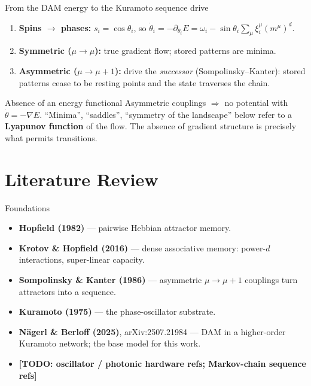 \documentclass[aspectratio=169]{beamer}
\newcommand{\xxi}{\xi}
\newcommand{\thetavar}{\theta}
\newcommand{\mvar}{m}
\newcommand{\TODO}[1]{{\color{red}\textbf{[TODO: #1]}}}
\begin{document}
\begin{frame}{From the DAM energy to the Kuramoto sequence drive}
  \begin{enumerate}
    \item \textbf{Spins $\to$ phases:} $s_i = \cos\thetavar_i$, so
      $\dot\thetavar_i = -\partial_{\thetavar_i} E
       = \omega_i - \sin\thetavar_i \sum_\mu \xxi_i^{\mu}(\mvar^\mu)^d$.
    \item \textbf{Symmetric ($\mu \to \mu$):} true gradient flow; stored
      patterns are minima.
    \item \textbf{Asymmetric ($\mu \to \mu+1$):} drive the \emph{successor}
      (Sompolinsky--Kanter): stored patterns cease to be resting points and
      the state traverses the chain.
  \end{enumerate}
  \begin{alertblock}{Absence of an energy functional}
    Asymmetric couplings $\Rightarrow$ no potential with
    $\dot{\thetavar} = -\nabla E$. ``Minima'', ``saddles'', ``symmetry of
    the landscape'' below refer to a \textbf{Lyapunov function} of the flow.
    The absence of gradient structure is precisely what permits transitions.
  \end{alertblock}
\end{frame}


\section{Literature Review}

\begin{frame}{Foundations}
  \begin{itemize}
    \item \textbf{Hopfield (1982)} --- pairwise Hebbian attractor memory.
    \item \textbf{Krotov \& Hopfield (2016)} --- dense associative memory:
      power-$d$ interactions, super-linear capacity.
    \item \textbf{Sompolinsky \& Kanter (1986)} --- asymmetric
      $\mu \to \mu+1$ couplings turn attractors into a sequence.
    \item \textbf{Kuramoto (1975)} --- the phase-oscillator substrate.
    \item \textbf{N\"agerl \& Berloff (2025)}, arXiv:2507.21984 --- DAM in a
      higher-order Kuramoto network; the base model for this work.
    \item \TODO{oscillator / photonic hardware refs; Markov-chain sequence refs}
  \end{itemize}
\end{frame}
\end{document}
